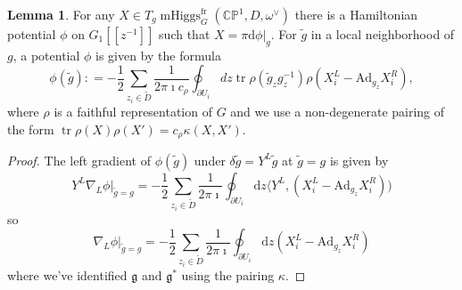 \documentclass[11pt, oneside, reqno]{amsart}
\theoremstyle{definition} \newtheorem{definition}{Definition}[section]
\newtheorem{lemma}[definition]{Lemma}
\theoremstyle{definition} \newtheorem{remark}[definition]{Remark}
\theoremstyle{definition} \newtheorem{remarks}[definition]{Remarks}
\theoremstyle{definition} \newtheorem{question}[definition]{Question}
\theoremstyle{definition} \newtheorem*{note}{Note}
\theoremstyle{definition} \newtheorem{example}[definition]{Example}
\theoremstyle{definition} \newtheorem{examples}[definition]{Examples}
\renewcommand{\gg}{\mathfrak{g}}
\newcommand{\bb}[1]{\mathbb{#1}}
\newcommand{\mr}[1]{\mathrm{#1}}
\DeclareMathOperator{\tr}{tr}
\DeclareMathOperator{\mhiggs}{mHiggs}
\renewcommand{\d}{\mathrm{d}}
\newcommand{\fr}{\mathrm{fr}}
\newcommand{\Ad}{\mr{Ad}}
\begin{document}
\begin{lemma}\label{xtophi}
  For any $X \in T_{g} \mhiggs^\fr_G(\bb{CP}^1, D, \omega^\vee)$ there is a Hamiltonian potential $\phi$ on $G_1[[z^{-1}]]$ such that $X = \pi \d \phi|_{g}$.  For $\tilde g$ in a local neighborhood of $g$, a potential $\phi$ is given by the formula 
\[
  \phi(\tilde g) : = -\frac 1 2 \sum_{z_i \in \tilde D} \frac{1}{2 \pi \imath c_\rho} \oint_{\partial U_{i}} 
dz  \tr \rho( \tilde g_z  g_z^{-1}) \rho(X^{L}_i - \Ad_{ g_z} X_{i}^{R}),
\]
where $\rho$ is a faithful representation of $G$ and we use a non-degenerate pairing of the form $\tr\rho(X) \rho(X') = c_\rho \kappa(X, X')$.
\end{lemma}
  
\begin{proof}
The left gradient of $\phi(\tilde g)$ under $ \delta \tilde g = Y^{L} \tilde g$ at $\tilde g = g$ is given by
\begin{equation}
  Y^{L} \nabla_{L} \phi|_{\tilde g = g}  = - \frac 1 2  \sum_{z_i \in \tilde D} \frac{1}{2 \pi \imath } \oint_{\partial U_{i}}  \d z
 \langle  Y^{L} , (X^{L}_i - \Ad_{g_z} X_i^R) ) 
\end{equation}
so 
\begin{equation}
  \nabla_{L} \phi|_{\tilde g = g}  = -\frac 1 2  \sum_{z_i \in \tilde D} \frac{1}{2 \pi \imath } \oint_{\partial U_{i}}  \d z
 (X^{L}_i - \Ad_{g_z} X_i^R) 
\end{equation}
where we've identified $\gg$ and $\gg^{*}$ using the pairing $\kappa$. 


\end{proof}
\end{document}
